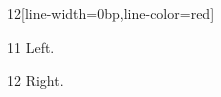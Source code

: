 \documentclass[paper=A4]{ropas-poster}
\begin{document}
\begin{postergrid}{1}{2}[line-width=0bp,line-color=red]
\begin{posterblock}{1}{1}
Left.
\end{posterblock}
\begin{posterblock}{1}{2}
Right.
\end{posterblock}
\end{postergrid}
\end{document}

